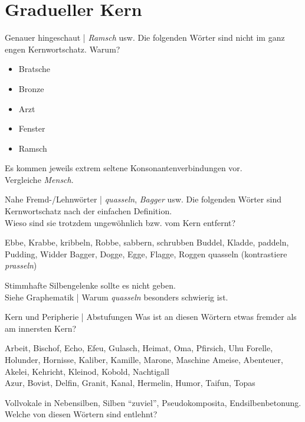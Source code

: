 \section{Gradueller Kern}

\begin{frame}
  {Genauer hingeschaut | \textit{Ramsch} usw.}
  \onslide<+->
  \onslide<+->
  Die folgenden Wörter sind nicht im ganz engen Kernwortschatz. Warum?\\
  \Zeile
  \begin{itemize}[<+->]
    \item Bratsche
    \item Bronze
    \item Arzt
    \item Fenster
    \item Ramsch
  \end{itemize}
  \onslide<+->
  \Zeile
  Es kommen jeweils \alert{extrem seltene Konsonantenverbindungen} vor.\\
  \onslide<+->
  Vergleiche \alert{\textit{Mensch}}.
\end{frame}

\begin{frame}
  {Nahe Fremd-\slash Lehnwörter | \textit{quasseln}, \textit{Bagger} usw.}
  \onslide<+->
  \onslide<+->
  Die folgenden Wörter sind Kernwortschatz nach der einfachen Definition.\\
  Wieso sind sie trotzdem ungewöhnlich bzw. vom Kern entfernt?\\
  \Zeile
  \onslide<+->
  \begin{exe}
    \ex Ebbe, Krabbe, kribbeln, Robbe, sabbern, schrubben
    \ex Buddel, Kladde, paddeln, Pudding, Widder
    \ex Bagger, Dogge, Egge, Flagge, Roggen
    \Halbzeile
    \ex quasseln (kontrastiere \textit{prasseln})
  \end{exe}
  \onslide<+->
  \Zeile
  \alert{Stimmhafte Silbengelenke} sollte es nicht geben.\\
  Siehe Graphematik | Warum \textit{quasseln} besonders schwierig ist.
\end{frame}

\begin{frame}
  {Kern und Peripherie | Abstufungen}
  \onslide<+->
  \onslide<+->
  Was ist an diesen Wörtern etwas fremder als am innersten Kern?\\
  \Halbzeile
  \begin{exe}
    \ex Arbeit, Bischof, Echo, Efeu, Gulasch, Heimat, Oma, Pfirsich, Uhu
    \onslide<+->
    \ex Forelle, Holunder, Hornisse, Kaliber, Kamille, Marone, Maschine
    \onslide<+->
    \ex Ameise, Abenteuer, Akelei, Kehricht, Kleinod, Kobold, Nachtigall\\
    \onslide<+->
    \ex Azur, Bovist, Delfin, Granit, Kanal, Hermelin, Humor, Taifun, Topas
  \end{exe}
  \onslide<+->
  \Zeile
  \alert{Vollvokale} in Nebensilben, \alert{Silben "`zuviel"'}, \alert{Pseudokomposita}, \alert{Endsilbenbetonung}.\\
  \Halbzeile
  \onslide<+->
  Welche von diesen Wörtern sind entlehnt?
\end{frame}

